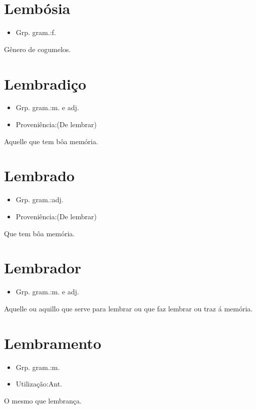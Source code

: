 \section{Lembósia}
\begin{itemize}
\item {Grp. gram.:f.}
\end{itemize}
Gênero de cogumelos.
\section{Lembradiço}
\begin{itemize}
\item {Grp. gram.:m.  e  adj.}
\end{itemize}
\begin{itemize}
\item {Proveniência:(De \textunderscore lembrar\textunderscore )}
\end{itemize}
Aquelle que tem bôa memória.
\section{Lembrado}
\begin{itemize}
\item {Grp. gram.:adj.}
\end{itemize}
\begin{itemize}
\item {Proveniência:(De \textunderscore lembrar\textunderscore )}
\end{itemize}
Que tem bôa memória.
\section{Lembrador}
\begin{itemize}
\item {Grp. gram.:m.  e  adj.}
\end{itemize}
Aquelle ou aquillo que serve para lembrar ou que faz lembrar ou traz á memória.
\section{Lembramento}
\begin{itemize}
\item {Grp. gram.:m.}
\end{itemize}
\begin{itemize}
\item {Utilização:Ant.}
\end{itemize}
O mesmo que \textunderscore lembrança\textunderscore .
